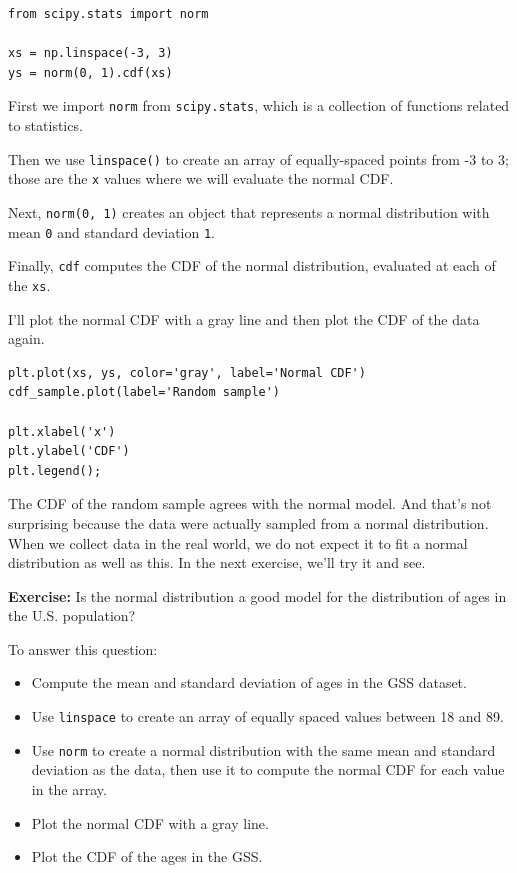 \begin{lstlisting}[]
from scipy.stats import norm

xs = np.linspace(-3, 3)
ys = norm(0, 1).cdf(xs)
\end{lstlisting}

First we import \passthrough{\lstinline!norm!} from
\passthrough{\lstinline!scipy.stats!}, which is a collection of
functions related to statistics.

Then we use \passthrough{\lstinline!linspace()!} to create an array of
equally-spaced points from -3 to 3; those are the
\passthrough{\lstinline!x!} values where we will evaluate the normal
CDF.

Next, \passthrough{\lstinline!norm(0, 1)!} creates an object that
represents a normal distribution with mean \passthrough{\lstinline!0!}
and standard deviation \passthrough{\lstinline!1!}.

Finally, \passthrough{\lstinline!cdf!} computes the CDF of the normal
distribution, evaluated at each of the \passthrough{\lstinline!xs!}.

I'll plot the normal CDF with a gray line and then plot the CDF of the
data again.

\begin{lstlisting}[]
plt.plot(xs, ys, color='gray', label='Normal CDF')
cdf_sample.plot(label='Random sample')

plt.xlabel('x')
plt.ylabel('CDF')
plt.legend();
\end{lstlisting}

The CDF of the random sample agrees with the normal model. And that's
not surprising because the data were actually sampled from a normal
distribution. When we collect data in the real world, we do not expect
it to fit a normal distribution as well as this. In the next exercise,
we'll try it and see.

\textbf{Exercise:} Is the normal distribution a good model for the
distribution of ages in the U.S. population?

To answer this question:

\begin{itemize}
\item
  Compute the mean and standard deviation of ages in the GSS dataset.
\item
  Use \passthrough{\lstinline!linspace!} to create an array of equally
  spaced values between 18 and 89.
\item
  Use \passthrough{\lstinline!norm!} to create a normal distribution
  with the same mean and standard deviation as the data, then use it to
  compute the normal CDF for each value in the array.
\item
  Plot the normal CDF with a gray line.
\item
  Plot the CDF of the ages in the GSS.
\end{itemize}

